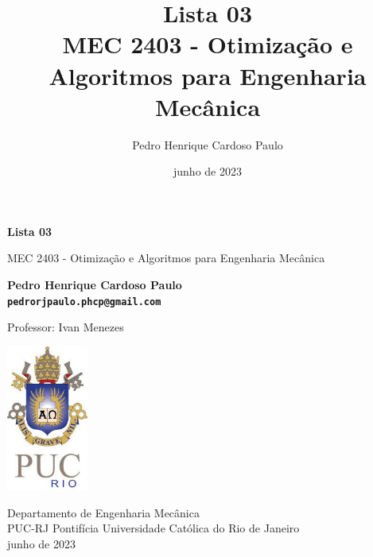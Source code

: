 \documentclass[10pt, a4paper]{article}
\begin{document}
\def\TITLE{Lista 03}
\def\DISCIPLINE{MEC 2403 - Otimização e Algoritmos para Engenharia Mecânica}
\def\PROFESSOR{Ivan Menezes}
\def\AUTHOR{Pedro Henrique Cardoso Paulo}
\def\CONTACT{pedrorjpaulo.phcp@gmail.com}
\def\DATE{junho de 2023}

\title{\textbf{\TITLE} \\ \DISCIPLINE}
\author{\AUTHOR}
\date{\DATE}

\begin{titlepage}
      \begin{center}
          \vspace*{1cm}

          \Huge
          \textbf{\TITLE}

          \vspace{0.5cm}
          \LARGE
          \DISCIPLINE

          \vspace{1.5cm}

          \textbf{\AUTHOR \\ {\tt \CONTACT}}

          \vfill
          Professor: \PROFESSOR

          \vspace{0.8cm}

          \includegraphics[width=0.2\textwidth]{../general/puc.jpg}

          \Large
          Departamento de Engenharia Mecânica\\
          PUC-RJ Pontifícia Universidade Católica do Rio de Janeiro\\
          \DATE

      \end{center}
  \end{titlepage}



\end{document}

